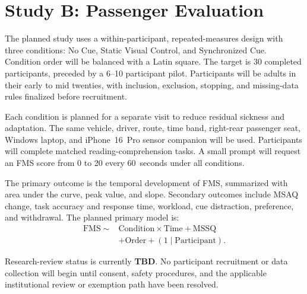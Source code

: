 \section{Study B: Passenger Evaluation}
\label{sec:study-b}

The planned study uses a within-participant, repeated-measures design with three conditions: No Cue, Static Visual Control, and Synchronized Cue. Condition order will be balanced with a Latin square. The target is 30 completed participants, preceded by a 6--10 participant pilot. Participants will be adults in their early to mid twenties, with inclusion, exclusion, stopping, and missing-data rules finalized before recruitment.

Each condition is planned for a separate visit to reduce residual sickness and adaptation. The same vehicle, driver, route, time band, right-rear passenger seat, Windows laptop, and iPhone~16~Pro sensor companion will be used. Participants will complete matched reading-comprehension tasks. A small prompt will request an FMS score from 0 to 20 every 60~seconds under all conditions.

The primary outcome is the temporal development of FMS, summarized with area under the curve, peak value, and slope. Secondary outcomes include MSAQ change, task accuracy and response time, workload, cue distraction, preference, and withdrawal. The planned primary model is:
\begin{equation}
\begin{aligned}
\mathrm{FMS} \sim {} & \mathrm{Condition} \times \mathrm{Time} + \mathrm{MSSQ} \\
                      & + \mathrm{Order} + (1 \mid \mathrm{Participant}).
\end{aligned}
\end{equation}

Research-review status is currently \textbf{TBD}. No participant recruitment or data collection will begin until consent, safety procedures, and the applicable institutional review or exemption path have been resolved.
